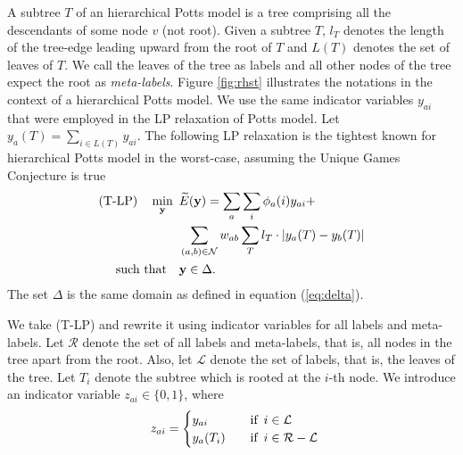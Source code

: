 A subtree $T$ of an hierarchical Potts model is a tree comprising all the descendants of some node $v$ (not root). Given a subtree $T$, $l_T$ denotes the length of the tree-edge leading upward from the root of $T$ and $L(T)$ denotes the set of leaves of $T$. We call the leaves of the tree as labels and all other nodes of the tree expect the root as \emph{meta-labels}. Figure \ref{fig:rhst} illustrates the notations in the context of a hierarchical Potts model.
%
 We use the same indicator variables
$y_{ai}$ that were employed in the LP relaxation of Potts model. Let $y_a(T)
= \sum_{i \in L(T)} y_{ai}$. The following LP relaxation is the tightest known
for hierarchical Potts model in the worst-case, assuming the Unique Games
Conjecture is true \citep{manokaran2008sdp}
\begin{align}
\text{(T-LP)} \quad \min_{\bf y} \enskip & \widetilde{E}({\bf y}) =  \sum_{a} \sum_{i} \phi_a(i)y_{ai} + \nonumber\\
                                         &\sum_{(a, b) \in {\mathcal N}} w_{ab} \sum_T l_T \cdot |y_{a}(T) - y_{b}(T)| \nonumber\\
    \text{such that} \quad &{\bf y} \in \Delta.
\label{eq:t-lp}
\end{align}
The set $\Delta$ is the same domain as defined in equation (\ref{eq:delta}). 

 We take (T-LP) and rewrite it using indicator variables for all labels and meta-labels. Let $\mathcal R$ denote the set of all labels and meta-labels, that is, all nodes in the tree apart from the root. Also, let $\mathcal L$ denote the set of labels, that is, the leaves of the tree. Let $T_i$ denote the subtree which is rooted at the $i$-th node. We introduce an indicator variable $z_{ai} \in \{0, 1\}$, where
\begin{align}
    \enskip  z_{ai} =  \begin{cases} 
        y_{ai} \quad &\text{if} \enskip i \in {\mathcal L} \\
        y_{a}(T_i) \quad &\text{if} \enskip i \in {\mathcal R - \mathcal L} \\
    \end{cases}
\end{align}

